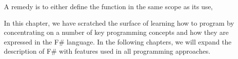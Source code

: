 
A remedy is to either define the function in the same scope as its use,
%


In this chapter, we have scratched the surface of learning how to program by concentrating on a number of key programming concepts and how they are expressed in the F\# language. In the following chapters, we will expand the description of F\# with features used in all programming approaches.

